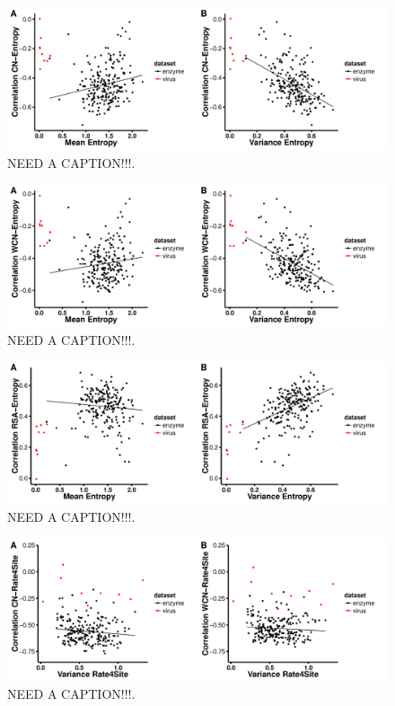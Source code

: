 \documentclass[12pt]{article}
\begin{document}
    \begin{figure}[H]
            \centerline{\includegraphics[width=7.5in]{entropy_cn_cor.pdf}}     
            \caption{NEED A CAPTION!!!.}
            \label{fig:seqent_structure_cors}
    \end{figure}


    \begin{figure}[H]
            \centerline{\includegraphics[width=7.5in]{entropy_wcn_cor.pdf}}     
            \caption{NEED A CAPTION!!!.}
            \label{fig:seqent_structure_cors}
    \end{figure}


    \begin{figure}[H]
            \centerline{\includegraphics[width=7.5in]{entropy_rsa_cor.pdf}}     
            \caption{NEED A CAPTION!!!.}
            \label{fig:seqent_structure_cors}
    \end{figure}
  
       
        \begin{figure}[H]
            \centerline{\includegraphics[width=7.5in]{rate_cor.pdf}}     
            \caption{NEED A CAPTION!!!.}
            \label{fig:seqent_structure_cors}
    \end{figure}
    
\end{document}
